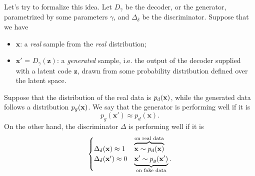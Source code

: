 
Let's try to formalize this idea. Let $D_{\gamma}$ be the decoder, or the generator, parametrized by some parameters $\gamma$, and $\Delta_{\delta}$ be the discriminator. Suppose that we have
\begin{itemize}
	\item $\mathbf{x}$: a \emph{real} sample from the \emph{real} distribution;
	\item $\mathbf{x'}$ = $D_{\gamma}(\mathbf{z})$: a \emph{generated} sample, i.e. the output of the decoder supplied with a latent code $\mathbf{z}$, drawn from some probability distribution defined over the latent space. 
\end{itemize}
Suppose that the distribution of the real data is $p_d(\vb{x})$, while the generated data follows a distribution $p_g(\vb{x})$. 
We say that the generator is performing well if it is
\begin{equation}
    p_g(\mathbf{x'}) \approx p_d(\mathbf{x}).
\end{equation}
On the other hand, the discriminator $\Delta$ is performing well if it is
\begin{equation}
    \begin{cases}
        \Delta_{\delta} (\vb{x}) \approx 1 & \overbrace{\vb{x} \sim p_d(\vb{x})}^{\text{on real data}} \\
        \Delta_{\delta} (\vb{x}') \approx 0 & \underbrace{\vb{x}' \sim p_g(\vb{x}')}_{\text{on fake data}}.
    \end{cases}
    \label{eq:13:1:2:d-obj}
\end{equation}


